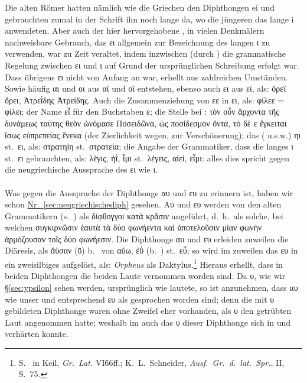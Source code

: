 Die alten Römer hatten nämlich wie die
Griechen den Diphthongen ei und gebrauchten zumal in der Schrift ihn noch lange
da, wo die jüngeren das lange i anwendeten. Aber auch der hier hervorgehobene
, in vielen Denkmälern nachweisbare Gebrauch, das ει allgemein zur
Bezeichnung des langen ι zu verwenden, war zu  Zeit veraltet, indem
inzwischen (durch ) die grammatische Regelung zwischen ει und ι auf
Grund der ursprünglichen Schreibung erfolgt war. Dass übrigens ει nicht von
Anfang an  war, erhellt aus zahlreichen Umständen. Sowie häufig αι und οι aus αϊ
und οϊ entstehen, ebenso auch ει aus εϊ, als: ὄρεϊ ὄρει, Ἀτρεΐδης Ἀτρείδης. Auch
die Zusammenziehung von εε in ει, als: φίλεε = φίλει; der Name εἶ für den
Buchstaben ε; die Stelle bei : τὸν οὖν ἄρχοντα τῆς
δυνάμεως ταύτης θεὸν ὠνόμασε Ποσειδῶνα, ὡς ποσίδεσμον ὄντα, τὸ δὲ ε ἔγκειται
ἴσως εὐπρεπείας ἕνεκα (der Zierlichkeit wegen, zur Verschönerung); das
( u.s.w.) ηι st.\ ει, als: στρατηίη st.\ στρατεία; die
Angabe der Grammatiker, dass die  langes ι st.\ ει
gebrauchten, als: λέγις, ἠΐ, ἶμι st.\ λέγεις, αἰεί, εἶμι: alles dies spricht
gegen die neugriechische Aussprache des ει wie ι.

\paragraph{} Was gegen die  Aussprache der Diphthonge αυ
und ευ zu erinnern ist, haben wir schon
\hyperref[sec:neugriechischediph]{Nr.~\ref{sec:neugriechischediph}} gesehen.
Αυ und ευ werden von den alten Grammatikern
(s.\ ) als δίφθογγοι κατἀ κρᾶσιν angeführt, d.~h.~als solche, bei welchen
συγκιρνῶσιν ἑαυτὰ τὰ δύο φωνήεντα καὶ ἀποτελοῦσιν μίαν φωνὴν ἁρμόζουσαν τοῖς δύο
φωνήεσιν. Die Diphthonge αυ und ευ erleiden zuweilen die Diäresis, als ἄϋσαν (ῡ)
b.\  von αὔω, ἐΰ (b.\ ) st.\ εὖ; so wird
im  zuweilen das  ευ
in ein zweisilbiges  aufgelöst, als: \emph{Orpheus} als
Daktylus.\footnote{%
	S.\  in Keil, \emph{Gr.\ Lat.} VI\. 66ff.; K.~L.~Schneider,
	\emph{Ausf.\ Gr.\ d.\ lat.\ Spr.}, II, S.\ 75.
}
Hieraus erhellt,
dass in beiden Diphthongen die beiden Laute vernommen worden sind. Da υ, wie wir
\hyperref[sec:ypsilon]{§\ref{sec:ypsilon}} sehen werden, ursprünglich wie  lautete, so ist anzunehmen, dass αυ wie
unser  und entsprechend ευ als  gesprochen worden sind; denn die mit
υ gebildeten Diphthonge waren ohne Zweifel eher vorhanden, als υ den
getrübten Laut  angenommen hatte; weshalb im 
auch das υ dieser Diphthonge sich in  und  verhärten konnte.

